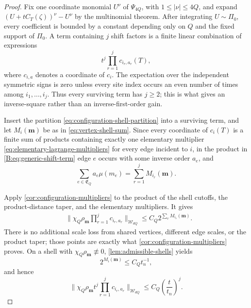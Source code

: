 \documentclass[11pt]{article}
\newcommand{\cW}{\mathcal{W}}
\newcommand{\norm}[1]{\lVert #1\rVert}
\newcommand{\abs}[1]{\lvert #1\rvert}
\begin{document}
\begin{proof}
Fix one coordinate monomial \(U^\nu\) of \(\Psi_{4Q}\), with
\(1\le\abs\nu\le4Q\), and expand
\((U+tC_T(\zeta))^\nu-U^\nu\) by the multinomial theorem.  After integrating
\(U\sim\Pi_0\), every coefficient is bounded by a constant depending only
on \(Q\) and the fixed support of \(\Pi_0\).  A term containing \(j\)
shift factors is a finite linear combination of expressions
\begin{equation}
 t^j\prod_{r=1}^j c_{i_r,a_r}(T),
 \label{B:eq:generic-shift-term}
\end{equation}
where \(c_{i,a}\) denotes a coordinate of \(c_i\).  The expectation over the
independent symmetric signs is zero unless every site index occurs an even
number of times among \(i_1,\ldots,i_j\).  Thus every surviving term has
\(j\ge2\); this is what gives an inverse-square rather than an
inverse-first-order gain.

Insert the partition \eqref{eq:configuration-shell-partition} into a
surviving term, and let \(M_i(\bm m)\) be as in \eqref{eq:vertex-shell-sum}.
Since every coordinate of \(c_i(T)\) is a finite sum of products
containing exactly one elementary multiplier
\eqref{eq:elementary-lagrange-multipliers} for every edge incident to
\(i\), in the product in \eqref{B:eq:generic-shift-term} edge \(e\) occurs
with some inverse order \(a_e\), and
\begin{equation}
 \sum_{e\in\mathfrak E_Q}a_e\mu(m_e)
 =\sum_{r=1}^jM_{i_r}(\bm m).
 \label{B:eq:inverse-order-ledger}
\end{equation}

Apply \cref{cor:configuration-multipliers} to the product of the shell
cutoffs, the product-distance taper, and the elementary multipliers.  It
gives
\begin{align}
 &\norm{
   \chi_Q\rho_{\bm m}
   \prod_{r=1}^jc_{i_r,a_r}
  }_{\cW_{dQ}}
 \le C_Q2^{\sum_rM_{i_r}(\bm m)}.
 \label{B:eq:shellwise-c-bound}
\end{align}
There is no additional scale loss from shared vertices, different edge
scales, or the product taper; those points are exactly what
\cref{cor:configuration-multipliers} proves.  On a shell with
\(\chi_Q\rho_{\bm m}\not\equiv0\), \cref{lem:admissible-shells} yields
\[
 2^{M_i(\bm m)}\le C_Qt_n^{-1},
\]
and hence
\begin{equation}
 \norm{
   \chi_Q\rho_{\bm m}
   t^j\prod_{r=1}^jc_{i_r,a_r}
  }_{\cW_{dQ}}
 \le C_Q\left(\frac{t}{t_n}\right)^j.
 \label{B:eq:one-shell-shift-bound}
\end{equation}


\end{proof}
\end{document}
